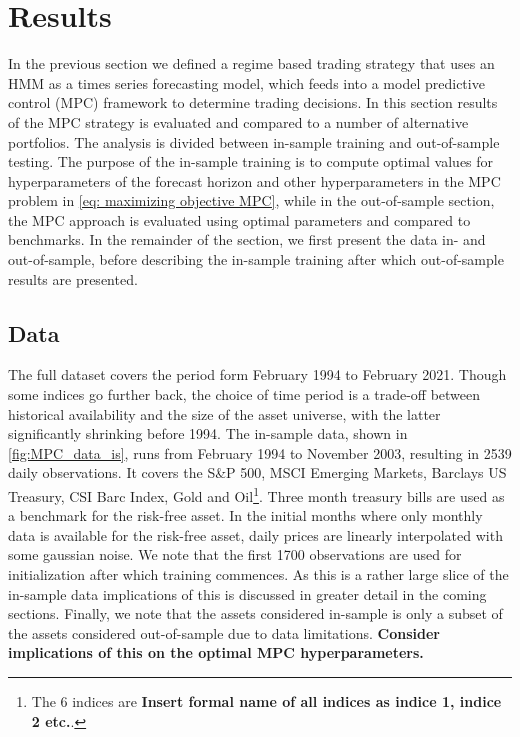 \section{Results}

In the previous section we defined a regime based trading strategy that uses an HMM as a times series forecasting model, which feeds into a model predictive control (MPC) framework to determine trading decisions. In this section results of the MPC strategy is evaluated and compared to a number of alternative portfolios. The analysis is divided between in-sample training and out-of-sample testing. The purpose of the in-sample training is to compute optimal values for hyperparameters of the forecast horizon and other hyperparameters in the MPC problem in \cref{eq: maximizing objective MPC}, while in the out-of-sample section, the MPC approach is evaluated using optimal parameters and compared to benchmarks. In the remainder of the section, we first present the data in- and out-of-sample, before describing the in-sample training after which out-of-sample results are presented.

\subsection{Data}

The full dataset covers the period form February 1994 to February 2021. Though some indices go further back, the choice of time period is a trade-off between historical availability and the size of the asset universe, with the latter significantly shrinking before 1994. The in-sample data, shown in \cref{fig:MPC_data_is}, runs from February 1994 to November 2003, resulting in 2539 daily observations. It covers the S\&P 500, MSCI Emerging Markets, Barclays US Treasury, CSI Barc Index, Gold and Oil\footnote{
The 6 indices are \textbf{Insert formal name of all indices as indice 1, indice 2 etc.}.
}.
Three month treasury bills are used as a benchmark for the risk-free asset. In the initial months where only monthly data is available for the risk-free asset, daily prices are linearly interpolated with some gaussian noise. We note that the first 1700 observations are used for initialization after which training commences. As this is a rather large slice of the in-sample data implications of this is discussed in greater detail in the coming sections. Finally, we note that the assets considered in-sample is only a subset of the assets considered out-of-sample due to data limitations. \textbf{Consider implications of this on the optimal MPC hyperparameters.}

